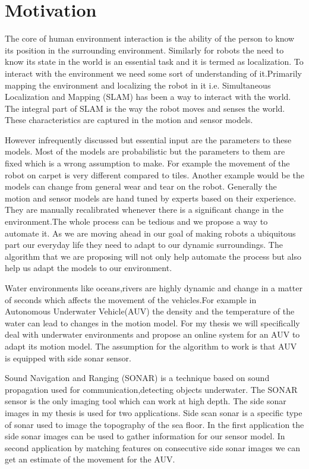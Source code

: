 \documentclass[12pt]{dalcsthesis}
\begin{document}
\section{Motivation}
The core of human environment interaction is the ability of the person to know its position in the surrounding environment. Similarly for robots the need to know its state in the world is an essential task and it is termed as localization. To interact with the environment we need some sort of understanding of it.Primarily mapping the environment and localizing the robot in it i.e. Simultaneous Localization and Mapping (SLAM) has been a way to interact with the world. The integral part of SLAM is the way the robot moves and senses the world. These characteristics are captured in the motion and sensor models.

However infrequently discussed but essential input are the parameters to these models. Most of the models are probabilistic but the parameters to them are fixed which is a wrong assumption to make. For example the movement of the robot on carpet is very different compared to tiles. Another example would be the models can change from general wear and tear on the robot. Generally the motion and sensor models are hand tuned by experts based on their experience. They are manually recalibrated whenever there is a significant change in the environment.The whole process can be tedious and we propose a way to automate it. As we are moving ahead in our goal of making robots a ubiquitous part our everyday life they need to adapt to our dynamic surroundings. The algorithm that we are proposing will not only help automate the process but also help us adapt the models to our environment.

Water environments like oceans,rivers are highly dynamic and change in a matter of seconds which affects the movement of the vehicles.For example in Autonomous Underwater Vehicle(AUV) the density and the temperature of the water can lead to changes in the motion model. For my thesis we will specifically deal with underwater environments and propose an online system for an AUV to adapt its motion model. The assumption for the algorithm to work is that AUV is equipped with side sonar sensor. 

Sound Navigation and Ranging (SONAR) is a technique based on sound propagation used for communication,detecting objects underwater. The SONAR sensor is the only imaging tool which can work at high depth. The side sonar images in my thesis is used for two applications. Side scan sonar is a specific type of sonar used to image the topography of the sea floor. In the first application the side sonar images can be used to gather information for our sensor model. In second application by matching features on consecutive side sonar images we can get an estimate of the movement for the AUV. 
\end{document}

